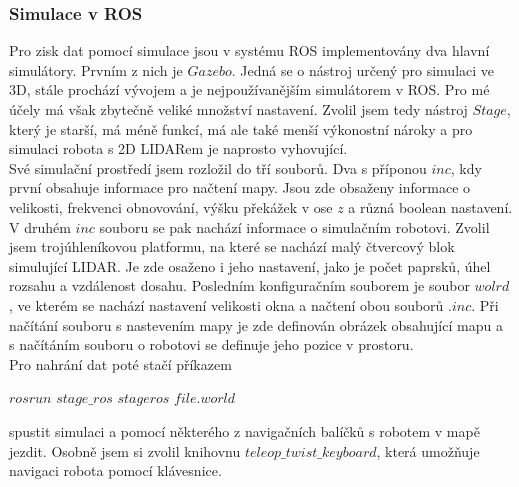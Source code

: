 \documentclass[12pt]{article}
\begin{document}
\subsubsection{Simulace v ROS}
Pro zisk dat pomocí simulace jsou v systému ROS implementovány dva hlavní simulátory. Prvním z nich je $Gazebo$. Jedná se o nástroj určený pro simulaci ve 3D, stále prochází vývojem a je nejpoužívanějším simulátorem v ROS. Pro mé účely má však zbytečně veliké množství nastavení. Zvolil jsem tedy nástroj $Stage$, který je starší, má méně funkcí, má ale také menší výkonostní nároky a pro simulaci robota s 2D LIDARem je naprosto vyhovující.\\
\indent Své simulační prostředí jsem rozložil do tří souborů. Dva s příponou $inc$, kdy první obsahuje informace pro načtení mapy. Jsou zde obsaženy informace o velikosti, frekvenci obnovování, výšku překážek v ose $z$ a různá boolean nastavení. V druhém $inc$ souboru se pak nachází informace o simulačním robotovi. Zvolil jsem trojúhleníkovou platformu, na které se nachází malý čtvercový blok simulující LIDAR. Je zde osaženo i jeho nastavení, jako je počet paprsků, úhel rozsahu a vzdálenost dosahu. Posledním konfiguračním souborem je soubor $wolrd$, ve kterém se nachází nastavení velikosti okna a načtení obou souborů $.inc$. Při načítání souboru s nastevením mapy je zde definován obrázek obsahující mapu a s načítáním souboru o robotovi se definuje jeho pozice v prostoru.\\
\indent Pro nahrání dat poté stačí příkazem
\begin{center}
	$rosrun$ $stage\_ros$ $stageros$ $file.world$
\end{center}
spustit simulaci a pomocí některého z navigačních balíčků s robotem v mapě jezdit. Osobně jsem si zvolil knihovnu $teleop\_twist\_keyboard$, která umožňuje navigaci robota pomocí klávesnice.
\end{document}
